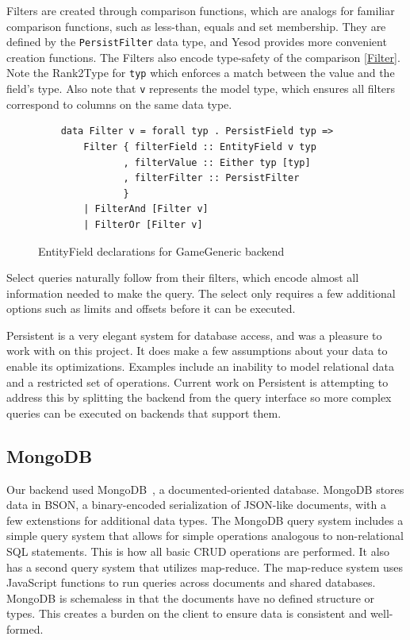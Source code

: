 \documentclass{chi2009}
\newcommand{\code}[1]{\texttt{#1}}
\begin{document}
Filters are created through comparison functions, which are analogs for familiar comparison functions, such as less-than, equals and set membership.  They are defined by the \code{PersistFilter} data type, and Yesod provides more convenient creation functions.  The Filters also encode type-safety of the comparison \ref{Filter}.  Note the Rank2Type for \code{typ} which enforces a match between the value and the field's type.  Also note that \code{v} represents the model type, which ensures all filters correspond to columns on the same data type.
\begin{figure}[]
\begin{verbatim}
    data Filter v = forall typ . PersistField typ => 
        Filter { filterField :: EntityField v typ
               , filterValue :: Either typ [typ]
               , filterFilter :: PersistFilter
               }
        | FilterAnd [Filter v]
        | FilterOr [Filter v]
\end{verbatim}
    \caption{EntityField declarations for GameGeneric backend}
    \label{EntityField}
\end{figure}
Select queries naturally follow from their filters, which encode almost all information needed to make the query.  The select only requires a few additional options such as limits and offsets before it can be executed.

Persistent is a very elegant system for database access, and was a pleasure to work with on this project.  It does make a few assumptions about your data to enable its optimizations.  Examples include an inability to model relational data and a restricted set of operations.  Current work on Persistent is attempting to address this by splitting the backend from the query interface so more complex queries can be executed on backends that support them.

\subsection{MongoDB}

Our backend used MongoDB~\cite{mongo}, a documented-oriented database. MongoDB stores data in BSON, a binary-encoded serialization of JSON-like documents, with a few extenstions for additional data types.  The MongoDB query system includes a simple query system that allows for simple operations analogous to non-relational SQL statements.  This is how all basic CRUD operations are performed.  It also has a second query system that utilizes map-reduce.  The map-reduce system uses JavaScript functions to run queries across documents and shared databases.  MongoDB is schemaless in that the documents have no defined structure or types.  This creates a burden on the client to ensure data is consistent and well-formed.
\end{document}
